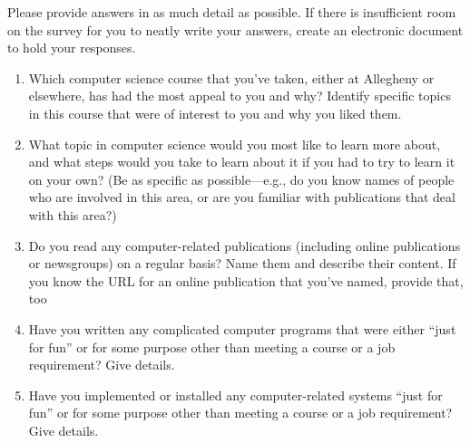 



Please provide answers in as much detail as possible. If there is insufficient
room on the survey for you to neatly write your answers, create an electronic
document to hold your responses.

\begin{enumerate}
\item
Which computer science course that you've taken, either 
at Allegheny or elsewhere, has had the most appeal to 
you and why?  Identify specific topics in this course 
that were of interest to you and why you liked them.

\vspace{1.5in}

\item
What topic in computer science would you most like to learn more about,
and what steps would you take to learn about it if you had to try to 
learn it on your own? (Be as specific as possible---e.g., do you know names
of people who are involved in this area, or are you familiar with
publications that deal with this area?)

\vspace{1.5in}

\item
Do you read any computer-related publications (including 
online publications or newsgroups) on a regular basis? 
Name them and describe their content.  If you know the 
URL for an online publication that you've named, provide 
that, too 

\vspace{1.5in}

\item
Have you written any complicated computer programs that 
were either ``just for fun'' or for some purpose other 
than meeting a course or a job requirement? Give details.

\vspace{1.5in}

\item
Have you implemented or installed any computer-related 
systems ``just for fun'' or for some purpose other than 
meeting a course or a job requirement? Give details.

\vspace{1.5in}


\end{enumerate}
